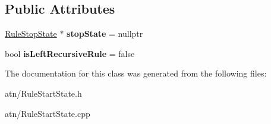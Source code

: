 \subsection*{Public Attributes}
\begin{DoxyCompactItemize}
\item 
\mbox{\label{classantlr4_1_1atn_1_1RuleStartState_a1a175cd5d05209195818063d687c2e2a}} 
\hyperlink{classantlr4_1_1atn_1_1RuleStopState}{Rule\+Stop\+State} $\ast$ {\bfseries stop\+State} = nullptr
\item 
\mbox{\label{classantlr4_1_1atn_1_1RuleStartState_a18041138579fc022b6657827543224f4}} 
bool {\bfseries is\+Left\+Recursive\+Rule} = false
\end{DoxyCompactItemize}


The documentation for this class was generated from the following files\+:\begin{DoxyCompactItemize}
\item 
atn/Rule\+Start\+State.\+h\item 
atn/Rule\+Start\+State.\+cpp\end{DoxyCompactItemize}
